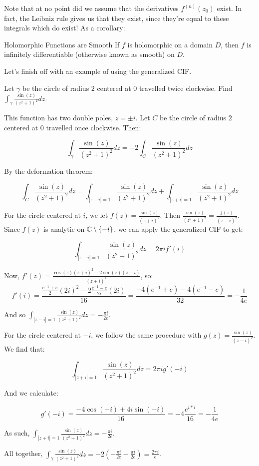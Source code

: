 Note that at no point did we assume that the derivatives $f^{(n)}(z_0)$ exist. In fact, the Leibniz rule gives us that they exist, since they're equal to these integrals which do exist! As a corollary:

\begin{corbo}{Holomorphic Functions are Smooth}{}
If $f$ is holomorphic on a domain $D$, then $f$ is infinitely differentiable (otherwise known as smooth) on $D$.
\end{corbo}

Let's finish off with an example of using the generalized CIF.

\begin{ex}{}{} Let $\gamma$ be the circle of radius $2$ centered at $0$ travelled twice clockwise. Find $\int_{\gamma} \frac{\sin(z)}{(z^2+1)^2}dz$.

This function has two double poles, $z = \pm i$. Let $C$ be the circle of radius $2$ centered at $0$ travelled once clockwise. Then:

$$\int_{\gamma} \frac{\sin(z)}{(z^2+1)^2}dz = -2\int_{C}\frac{\sin(z)}{(z^2+1)^2}dz$$

By the deformation theorem:

$$\int_{C} \frac{\sin(z)}{(z^2+1)^2} dz = \int_{|z-i|=1} \frac{\sin(z)}{(z^2+1)^2}dz + \int_{|z+i|=1} \frac{\sin(z)}{(z^2+1)^2}dz$$

For the circle centered at $i$, we let $f(z) = \frac{\sin(z)}{(z+i)^2}$. Then $\frac{\sin(z)}{(z^2+1)^2} = \frac{f(z)}{(z-i)^2}$. Since $f(z)$ is analytic on $\mathbb{C}\setminus\{-i\}$, we can apply the generalized CIF to get:

$$\int_{|z-i|=1} \frac{\sin(z)}{(z^2+1)^2} dz = 2\pi i f'(i)$$

Now, $f'(z) = \frac{\cos(z)(z+i)^2 - 2\sin(z)(z+i)}{(z+i)^4}$, so: 
$$f'(i) = \frac{\frac{e^{-1} + e}{2}(2i)^2 - 2\frac{e^{-1} - e}{2i}(2i)}{16} = \frac{-4(e^{-1} + e) - 4(e^{-1} - e)}{32} = -\frac{1}{4e}$$

And so $\int_{|z-i|=1}\frac{\sin(z)}{(z^2+1)^2}dz = -\frac{\pi i }{2e}$.

For the circle centered at $-i$, we follow the same procedure with $g(z) = \frac{\sin(z)}{(z-i)^2}$. We find that:

$$\int_{|z+i|=1} \frac{\sin(z)}{(z^2+1)^2}dz = 2\pi i g'(-i)$$

And we calculate:

$$g'(-i) = \frac{-4\cos(-i) + 4i\sin(-i)}{16} = -4\frac{e^{i*i}}{16} = -\frac{1}{4e}$$

As such, $\int_{|z+i|=1}\frac{\sin(z)}{(z^2+1)^2}dz = -\frac{\pi i }{2e}$.

All together, $\int_{\gamma} \frac{\sin(z)}{(z^2+1)^2}dz = -2(-\frac{\pi i }{2e} -\frac{\pi i }{2e}) = \frac{2\pi i }{e} $.
\end{ex}

